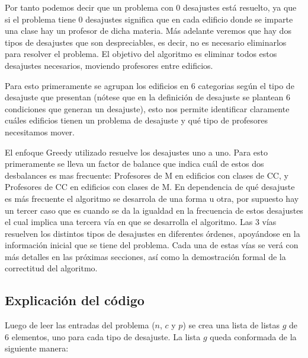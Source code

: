 \documentclass[11pt]{article}
\begin{document}
    Por tanto podemos decir que un problema con 0 desajustes está resuelto, ya que si el problema tiene
    0 desajustes significa que en cada edificio donde se imparte una clase hay un profesor de dicha materia.
    Más adelante veremos que hay dos tipos de desajustes que son despreciables, es decir, no es necesario
    eliminarlos para resolver el problema. El objetivo del algoritmo es eliminar todos estos desajustes necesarios, 
    moviendo profesores entre edificios.

    Para esto primeramente se agrupan los edificios en 6 categorias según el tipo de desajuste que presentan
    (nótese que en la definición de desajuste se plantean 6 condiciones que generan un desajuste), esto nos 
    permite identificar claramente cuáles edificios tienen un problema de desajuste y qué tipo de profesores 
    necesitamos mover.

    El enfoque Greedy utilizado resuelve los desajustes uno a uno. Para esto primeramente se lleva un factor
    de balance que indica cuál de estos dos desbalances es mas frecuente: Profesores de M en edificios con clases 
    de CC, y Profesores de CC en edificios con clases de M. En dependencia de qué desajuste es más frecuente el 
    algoritmo se desarrola de una forma u otra, por supuesto hay un tercer caso que es cuando se da la igualdad en 
    la frecuencia de estos desajustes el cual implica una tercera vía en que se desarrolla el algoritmo. Las 3 vías 
    resuelven los distintos tipos de desajustes en diferentes órdenes, apoyándose en la información inicial que se 
    tiene del problema. Cada una de estas vías se verá con más detalles en las próximas secciones, así como la 
    demostración formal de la correctitud del algoritmo.

    \subsection{Explicación del código}
    Luego de leer las entradas del problema ($n$, $c$ y $p$) se crea una lista de listas $g$ de 6 elementos, uno para
    cada tipo de desajuste. La lista $g$ queda conformada de la siguiente manera:
\end{document}

